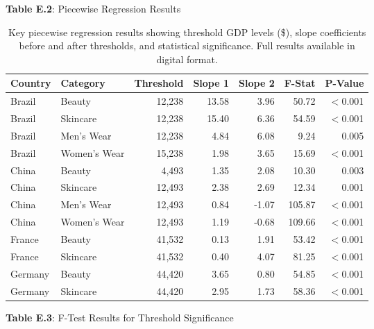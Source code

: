 \documentclass[11pt]{article}
\begin{document}
\textbf{Table E.2}: Piecewise Regression Results

\begin{table}[H]
\centering
\small
\begin{tabular}{llrrrrr}
\toprule
Country & Category & Threshold & Slope 1 & Slope 2 & F-Stat & P-Value \\
\midrule
Brazil & Beauty & 12,238 & 13.58 & 3.96 & 50.72 & $<$0.001 \\
Brazil & Skincare & 12,238 & 15.40 & 6.36 & 54.59 & $<$0.001 \\
Brazil & Men's Wear & 12,238 & 4.84 & 6.08 & 9.24 & 0.005 \\
Brazil & Women's Wear & 15,238 & 1.98 & 3.65 & 15.69 & $<$0.001 \\
China & Beauty & 4,493 & 1.35 & 2.08 & 10.30 & 0.003 \\
China & Skincare & 12,493 & 2.38 & 2.69 & 12.34 & 0.001 \\
China & Men's Wear & 12,493 & 0.84 & -1.07 & 105.87 & $<$0.001 \\
China & Women's Wear & 12,493 & 1.19 & -0.68 & 109.66 & $<$0.001 \\
France & Beauty & 41,532 & 0.13 & 1.91 & 53.42 & $<$0.001 \\
France & Skincare & 41,532 & 0.40 & 4.07 & 81.25 & $<$0.001 \\
Germany & Beauty & 44,420 & 3.65 & 0.80 & 54.85 & $<$0.001 \\
Germany & Skincare & 44,420 & 2.95 & 1.73 & 58.36 & $<$0.001 \\
\bottomrule
\end{tabular}
\caption{Key piecewise regression results showing threshold GDP levels (\$), slope coefficients before and after thresholds, and statistical significance. Full results available in digital format.}
\end{table}

\textbf{Table E.3}: F-Test Results for Threshold Significance
\end{document}

